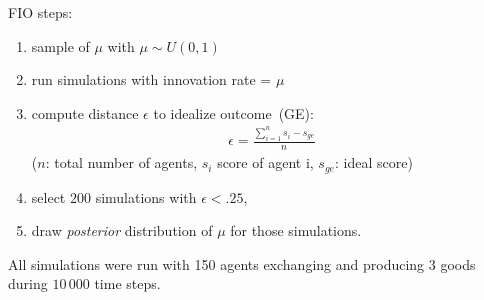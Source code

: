 \documentclass[a1paper,fontscale=.49]{baposter}
\newcommand{\compresslist}{
	\setlength{\itemsep}{1pt}
	\setlength{\parskip}{0pt}
	\setlength{\parsep}{0pt}
}
\begin{document}
\begin{poster}
{\vspace{.2cm}
{
	\footnotesize 
	FIO steps:
\vspace{-.3cm}
\setlength{\columnsep}{1mm}
	\begin{multicols*}{2}
	    \begin{enumerate}
		    \compresslist
		\item sample of $\mu$ with $\mu\sim U(0,1)$
		\item run simulations with innovation rate = $\mu$ 
		\item compute distance $\epsilon$ to idealize outcome~(GE):  
		    \begin{align*}
			\epsilon = \frac{ \sum_{i=1}^{n} s_i-s_{ge} }{n}   
		    \end{align*}
		    {\tiny ($n$: total number of agents, $s_i$ score of agent i, $s_{ge}$: ideal score)}
		    \vfill
		    \columnbreak
		\item select $200$ simulations with $\epsilon<.25$, 
		\item draw \emph{posterior} distribution of $\mu$ for those simulations.
	    \end{enumerate}
	\end{multicols*}
 }

All simulations were run with 150 agents exchanging and producing 3 goods during $10\,000$ time steps. 

 }




\end{poster}
\end{document}

